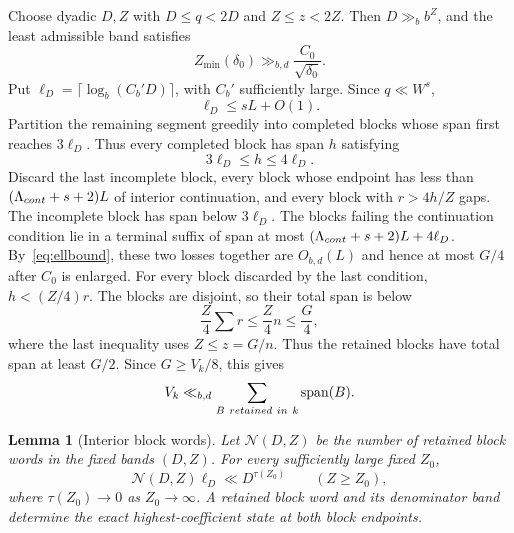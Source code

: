 \documentclass[10pt,a4paper]{amsart}
\newtheorem{lemma}[theorem]{Lemma}
\newcommand{\Span}{\operatorname{span}}
\begin{document}
Choose dyadic $D,Z$ with $D\le q<2D$ and $Z\le z<2Z$. Then
$D\gg_b b^Z$, and the least admissible band satisfies
\begin{equation}\label{eq:zmin}
 Z_{\min}(\delta_0)\gg_{b,d}\frac{C_0}{\sqrt{\delta_0}}.
\end{equation}
Put $\ell_D=\lceil\log_b(C_b'D)\rceil$, with $C_b'$ sufficiently large. Since
$q\ll W^s$,
\begin{equation}\label{eq:ellbound}
 \ell_D\le sL+O(1).
\end{equation}
Partition the remaining segment greedily into completed blocks whose span
first reaches $3\ell_D$. Thus every completed block has span $h$ satisfying
\begin{equation}\label{eq:blockspan}
 3\ell_D\le h\le4\ell_D.
\end{equation}
Discard the last incomplete block, every block whose endpoint has less than
$(\Lambda_{\rm cont}+s+2)L$ of interior continuation, and every block with
$r>4h/Z$ gaps. The incomplete block has span below $3\ell_D$. The blocks
failing the continuation condition lie in a terminal suffix of span at most
$(\Lambda_{\rm cont}+s+2)L+4\ell_D$. By~\eqref{eq:ellbound}, these two losses
together are $O_{b,d}(L)$ and hence at most $G/4$ after $C_0$ is enlarged.
For every block discarded by the last condition, $h<(Z/4)r$. The blocks are
disjoint, so their total span is below
\[
 \frac Z4\sum r\le\frac Z4n\le\frac G4,
\]
where the last inequality uses $Z\le z=G/n$. Thus the retained blocks have
total span at least $G/2$. Since $G\ge V_k/8$, this gives
\begin{equation}\label{eq:cover}
 V_k\ll_{b,d}\sum_{B\ {\rm retained\ in}\ k}\Span(B).
\end{equation}

\begin{lemma}[Interior block words]\label{lem:blocks}
Let $\mathcal N(D,Z)$ be the number of retained block words in the fixed
bands $(D,Z)$.
For every sufficiently large fixed $Z_0$,
\begin{equation}\label{eq:blockentropy}
 \mathcal N(D,Z)\ell_D\ll D^{\tau(Z_0)}
 \qquad(Z\ge Z_0),
\end{equation}
where $\tau(Z_0)\to0$ as $Z_0\to\infty$. A retained block word and its
denominator band determine the exact highest-coefficient state at both block
endpoints.
\end{lemma}
\end{document}
